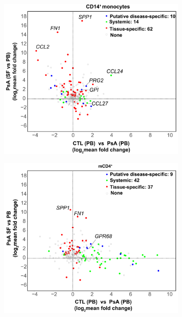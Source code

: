 \begin{figure}[htbp]
\centering
\begin{subfigure}{0.45\textwidth}
\centering
\includegraphics[width=\textwidth]{./Results3/pdfs/PSA_array_correlation_CD14_FC_HVPsA_vs_SFPBPsA}
\caption{\textbf{}}
\end{subfigure}%
\begin{subfigure}{0.45\textwidth}
\centering
\includegraphics[width=\textwidth]{./Results3/pdfs/PSA_array_correlation_CD4_FC_HVPsA_vs_SFPBPsA}

\end{subfigure}
\end{figure}
